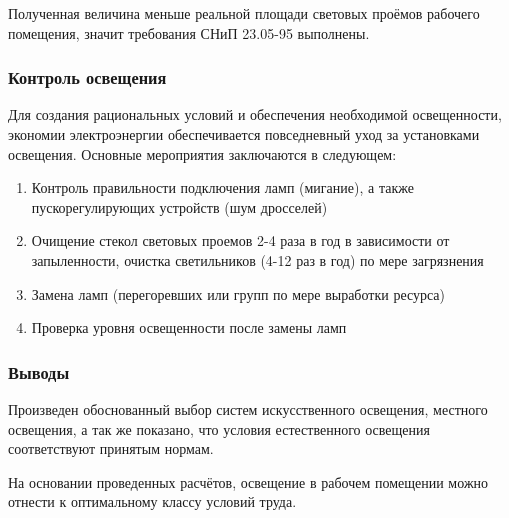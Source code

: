 Полученная величина меньше реальной площади световых проёмов рабочего
помещения, значит требования СНиП 23.05-95 \cite{ecology_snip_23_05_95} выполнены.

\subsubsection{Контроль освещения}

Для создания рациональных условий и обеспечения необходимой освещенности, экономии
электроэнергии обеспечивается повседневный уход за установками освещения. Основные
мероприятия заключаются в следующем:

\begin{enumerate}
    \item   Контроль правильности подключения ламп (мигание), а также пускорегулирующих
            устройств (шум дросселей)
    \item   Очищение стекол световых проемов 2-4 раза в год в зависимости от запыленности,
            очистка светильников (4-12 раз в год) по мере загрязнения
    \item   Замена ламп (перегоревших или групп по мере выработки ресурса)
    \item   Проверка уровня освещенности после замены ламп
\end{enumerate}

\subsubsection{Выводы}

Произведен обоснованный выбор систем искусственного освещения, местного освещения,
а так же показано, что условия естественного освещения соответствуют принятым нормам.

На основании проведенных расчётов, освещение в рабочем помещении можно отнести
к оптимальному классу условий труда.
